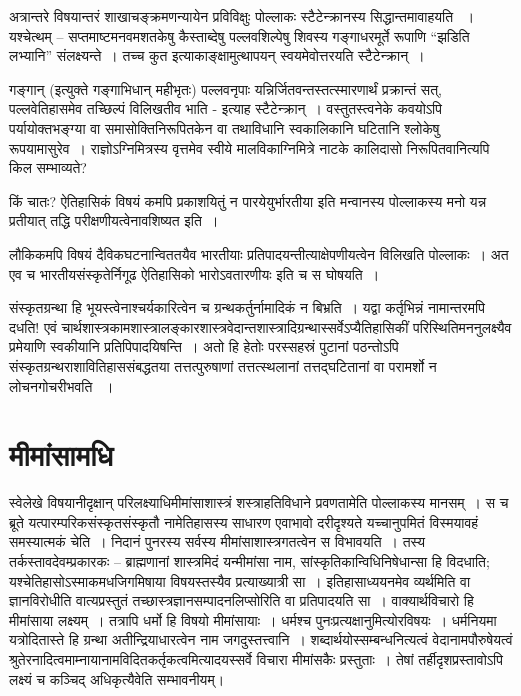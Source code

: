 अत्रान्तरे विषयान्तरं शाखाचङ्क्रमणन्यायेन प्रविविक्षुः पोल्लाकः स्टैटेन्क्रानस्य  सिद्धान्तमावाहयति ~। यश्चेत्थम् – सप्तमाष्टमनवमशतकेषु कैस्ताब्देषु पल्लवशिल्पेषु शिवस्य गङ्गाधरमूर्ते रूपाणि “झडिति लभ्यानि” संलक्ष्यन्ते~। तच्च कुत इत्याकाङ्क्षामुत्थापयन् स्वयमेवोत्तरयति स्टैटेन्क्रान्~।

गङ्गान् (इत्युक्ते गङ्गाभिधान् महीभृतः) पल्लवनृपाः यन्निर्जितवन्तस्तत्स्मारणार्थं प्रक्रान्तं सत्, पल्लवेतिहासमेव तच्छिल्पं विलिखतीव भाति - इत्याह स्टैटेन्क्रान्~। वस्तुतस्त्वनेके कवयोऽपि पर्यायोक्तभङ्ग्या वा समासोक्तिनिरूपितकेन वा तथाविधानि स्वकालिकानि घटितानि श्लोकेषु रूपयामासुरेव~। राज्ञोऽग्निमित्रस्य वृत्तमेव स्वीये मालविकाग्निमित्रे नाटके कालिदासो निरूपितवानित्यपि किल सम्भाव्यते?

किं चातः? ऐतिहासिकं विषयं कमपि प्रकाशयितुं न पारयेयुर्भारतीया इति मन्वानस्य पोल्लाकस्य मनो यन्न प्रतीयात् तद्धि परीक्षणीयत्वेनावशिष्यत इति~।

लौकिकमपि विषयं दैविकघटनान्विततयैव भारतीयाः प्रतिपादयन्तीत्याक्षेपणीयत्वेन विलिखति पोल्लाकः~। अत एव च भारतीयसंस्कृतेर्निगूढ ऐतिहासिको भारोऽवतारणीयः इति च स घोषयति~।

संस्कृतग्रन्था हि भूयस्त्वेनाश्चर्यकारित्वेन च ग्रन्थकर्तुर्नामादिकं न बिभ्रति~। यद्वा कर्तृभिन्नं नामान्तरमपि दधति! एवं चार्थशास्त्रकामशास्त्रालङ्कारशास्त्रवेदान्तशास्त्रादिग्रन्थास्सर्वेऽप्यैतिहासिकीं परिस्थितिमननुलक्ष्यैव प्रमेयाणि स्वकीयानि प्रतिपिपादयिषन्ति~। अतो हि हेतोः परस्सहस्रं पुटानां पठन्तोऽपि संस्कृतग्रन्थराशावितिहाससंबद्धतया तत्तत्पुरुषाणां तत्तत्स्थलानां तत्तद्घटितानां वा परामर्शो न लोचनगोचरीभवति ~।


\section*{मीमांसामधि}

स्वेलेखे विषयानीदृक्षान् परिलक्ष्याधिमीमांसाशास्त्रं शस्त्राहतिविधाने प्रवणतामेति पोल्लाकस्य मानसम्~। स च ब्रूते यत्पारम्परिकसंस्कृतसंस्कृतौ नामेतिहासस्य साधारण एवाभावो दरीदृश्यते यच्चानुपमितं विस्मयावहं समस्यात्मकं चेति~। निदानं पुनरस्य सर्वस्य मीमांसाशास्त्रगतत्वेन स विभावयति~। तस्य तर्कस्तावदेवम्प्रकारकः – ब्राह्मणानां शास्त्रमिदं यन्मीमांसा नाम, सांस्कृतिकान्विधिनिषेधान्सा हि विदधाति; यश्चेतिहासोऽस्माकमधजिगमिषाया विषयस्तस्यैव प्रत्याख्यात्री सा~। इतिहासाध्ययनमेव व्यर्थमिति वा ज्ञानविरोधीति वात्यप्रस्तुतं तच्छास्त्रज्ञानसम्पादनलिप्सोरिति वा प्रतिपादयति सा~। वाक्यार्थविचारो हि मीमांसाया लक्ष्यम्~। तत्रापि धर्मो हि विषयो मीमांसायाः~। धर्मश्च पुनःप्रत्यक्षानुमित्योरविषयः~। धर्मनियमा यत्रोदितास्ते हि ग्रन्था अतीन्द्रियाधारत्वेन नाम जगदुस्तत्त्वानि~। शब्दार्थयोस्सम्बन्धनित्यत्वं वेदानामपौरुषेयत्वं श्रुतेरनादित्वमाम्नायानामविदितकर्तृकत्वमित्यादयस्सर्वे विचारा मीमांसकैः प्रस्तुताः~। तेषां तर्हीदृशप्रस्तावोऽपि लक्ष्यं च कञ्चिद् अधिकृत्यैवेति सम्भावनीयम्।

